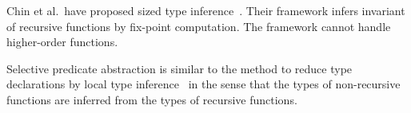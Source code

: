 Chin et al.~have proposed sized type inference~\cite{Chin2003}.  Their
framework infers invariant of recursive functions by fix-point
computation.  The framework cannot handle higher-order functions.

Selective predicate abstraction is similar to the method to reduce type
declarations by local type inference~\cite{Pierce2000} in the sense that the types
of non-recursive functions are inferred from the types of recursive functions.
